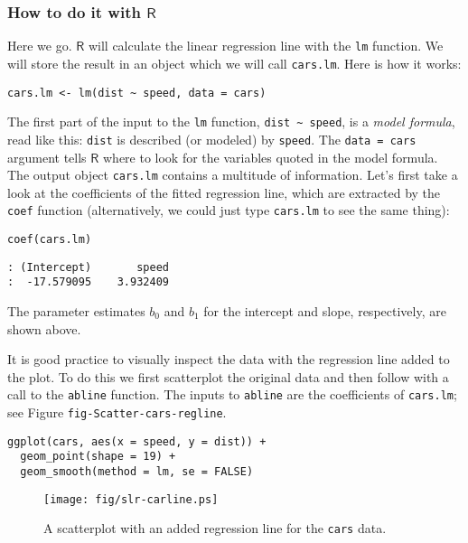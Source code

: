 \subsubsection{How to do it with \(\mathsf{R}\)}
\label{sec-11-2-1-1}

Here we go. \(\mathsf{R}\) will calculate the linear regression line
with the \texttt{lm} function. We will store the result in an object which we
will call \texttt{cars.lm}. Here is how it works:

\begin{verbatim}
cars.lm <- lm(dist ~ speed, data = cars)
\end{verbatim}

The first part of the input to the \texttt{lm} function, \texttt{dist \textasciitilde{} speed}, is a
\emph{model formula}, read like this: \texttt{dist} is described (or modeled) by
\texttt{speed}. The \texttt{data = cars} argument tells \(\mathsf{R}\) where to look
for the variables quoted in the model formula. The output object
\texttt{cars.lm} contains a multitude of information. Let's first take a look
at the coefficients of the fitted regression line, which are extracted
by the \texttt{coef} function (alternatively, we could just type \texttt{cars.lm} to
see the same thing):

\begin{verbatim}
coef(cars.lm)
\end{verbatim}

\begin{verbatim}
: (Intercept)       speed 
:  -17.579095    3.932409
\end{verbatim}

The parameter estimates \( b_{0} \) and \( b_{1} \) for the intercept
and slope, respectively, are shown above. 

It is good practice to visually inspect the data with the regression
line added to the plot. To do this we first scatterplot the original
data and then follow with a call to the \texttt{abline} function. The inputs
to \texttt{abline} are the coefficients of \texttt{cars.lm}; see Figure
\texttt{fig-Scatter-cars-regline}.

\begin{verbatim}
ggplot(cars, aes(x = speed, y = dist)) + 
  geom_point(shape = 19) + 
  geom_smooth(method = lm, se = FALSE)
\end{verbatim}

\begin{figure}[ht!]
\centering
\texttt{[image: fig/slr-carline.ps]}
\caption[Scatterplot with added regression line for the \texttt{cars} data]{\label{fig-carline}\small A scatterplot with an added regression line for the \texttt{cars} data.}
\end{figure}

